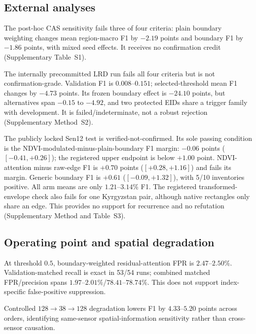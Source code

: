 \subsection{External analyses}

The post-hoc CAS sensitivity fails three of four criteria: plain boundary
weighting changes mean region-macro F1 by $-2.19$ points and boundary F1 by
$-1.86$ points, with mixed seed effects. It receives no confirmation credit
(Supplementary Table~S1).

The internally precommitted LRD run fails all four criteria but is not
confirmation-grade. Validation F1 is $0.008$--$0.151$; selected-threshold mean
F1 changes by $-4.73$ points. Its frozen boundary effect is $-24.10$ points,
but alternatives span $-0.15$ to $-4.92$, and two protected EIDs share a
trigger family with development. It is failed/indeterminate, not a robust
rejection (Supplementary Method~S2).

The publicly locked Sen12 test is verified-not-confirmed. Its sole passing
condition is the NDVI-modulated-minus-plain-boundary F1 margin: $-0.06$ points
($[-0.41,+0.26]$); the registered upper endpoint is below $+1.00$ point.
NDVI-attention minus raw-edge F1 is $+0.70$ points
($[+0.28,+1.16]$) and fails its margin. Generic boundary F1 is $+0.61$
($[-0.09,+1.32]$), with 5/10 inventories positive. All arm means are only
$1.21$--$3.14\%$ F1. The registered transformed-envelope check also fails for
one Kyrgyzstan pair, although native rectangles only share an edge. This
provides no support for recurrence and no refutation (Supplementary Method and
Table~S3).

\subsection{Operating point and spatial degradation}

At threshold $0.5$, boundary-weighted residual-attention FPR is
$2.47$--$2.50\%$. Validation-matched recall is exact in 53/54 runs; combined
matched FPR/precision spans $1.97$--$2.01\%$/$78.41$--$78.74\%$. This does not
support index-specific false-positive suppression.

Controlled $128\rightarrow38\rightarrow128$ degradation lowers F1 by
$4.33$--$5.20$ points across orders, identifying same-sensor
spatial-information sensitivity rather than cross-sensor causation.
